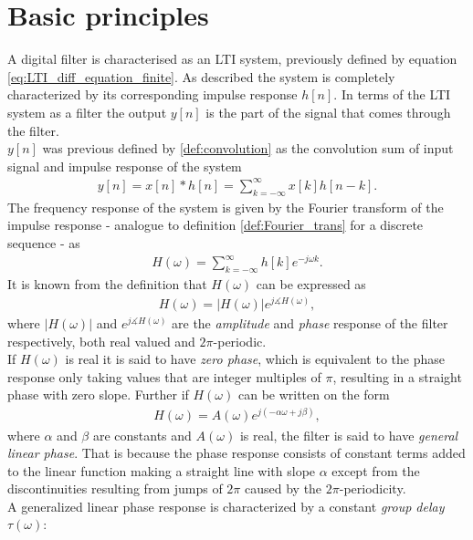 \section{Basic principles} \label{sec:basic_filter}
A digital filter is characterised as an LTI system, previously defined by equation \eqref{eq:LTI_diff_equation_finite}. As described the system is completely characterized by its corresponding impulse response $h[n]$. In terms of the LTI system as a filter the output $y[n]$ is the part of the signal that comes through the filter. \\
$y[n]$ was previous defined by \eqref{def:convolution} as the convolution sum of input signal and impulse response of the system
\begin{align}
y[n] = x[n]*h[n] = \sum_{k=-\infty}^{\infty} x[k]h[n-k].
\end{align}    
The frequency response of the system is given by the Fourier transform of the impulse response - analogue to definition \ref{def:Fourier_trans} for a discrete sequence - as
\begin{align}\label{eq:freq_res}
H(\omega)=\sum_{k=-\infty}^{\infty}h[k]e^{-j\omega k}.
\end{align}
It is known from the definition that $H(\omega)$ can be expressed as
\begin{align}
H(\omega)=|H(\omega)|e^{j\measuredangle H(\omega)},
\end{align}  
where $|H(\omega)|$ and $e^{j\measuredangle H(\omega)}$ are the \textit{amplitude} and \textit{phase} response of the filter respectively, both real valued and $2\pi$-periodic.\\
If $H(\omega)$ is real it is said to have \textit{zero phase}, which is equivalent to the phase response only taking values that are integer multiples of $\pi$, resulting in a straight phase with zero slope. Further if $H(\omega)$ can be written on the form 
\begin{align}\label{eq:lin_pha}
H(\omega)=A(\omega)e^{j(-\alpha\omega + j\beta)} ,
\end{align}
where $\alpha$ and $\beta$ are constants and $A(\omega)$ is real, the filter is said to have \textit{general linear phase}. That is because the phase response consists of constant terms added to the linear function making a straight line with slope $\alpha$ except from the discontinuities resulting from jumps of $2\pi$ caused by the $2\pi$-periodicity. \\
A generalized linear phase response is characterized by a constant \textit{group delay} $\tau(\omega)$:
